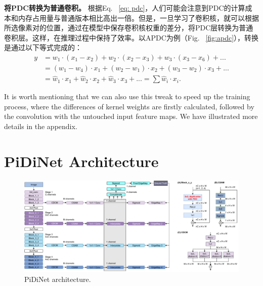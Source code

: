 \documentclass[10pt,twocolumn,letterpaper]{article}
\begin{document}
\vspace{0.3em}
\noindent \textbf{将PDC转换为普通卷积。} \quad 根据Eq. ~\ref{eq: pdc}，人们可能会注意到PDC的计算成本和内存占用量与普通版本相比高出一倍。但是，一旦学习了卷积核，就可以根据所选像素对的位置，通过在模型中保存卷积核权重的差分，将PDC层转换为普通卷积层。这样，在推理过程中保持了效率。以APDC为例（Fig. ~\ref{fig:apdc}），转换是通过以下等式完成的：
{\small 
\begin{align}
    y &= w_{1}\cdot (x_1 - x_2) + w_2\cdot (x_2 - x_3)+w_3\cdot (x_3 - x_6) + ... \nonumber\\
    &=(w_1 - w_4)\cdot x_1 + (w_2 - w_1)\cdot x_2 + (w_3 - w_2)\cdot x_3 + ...\nonumber\\
    &=\hat{w}_1\cdot x_1 + \hat{w}_2\cdot x_2 + \hat{w}_3\cdot x_3 + ... =\sum \hat{w}_i\cdot x_i.
\end{align}
}

It is worth mentioning that we can also use this tweak to speed up the training process, where the differences of kernel weights are firstly calculated, followed by the convolution with the untouched input feature maps. We have illustrated more details in the appendix.


\section{PiDiNet Architecture}

\begin{figure}[t!]
    \centering
    \includegraphics[width=0.98\linewidth]{images/arch.pdf}
    \caption{PiDiNet architecture.}
    \label{fig:arch}
\end{figure}
\end{document}
